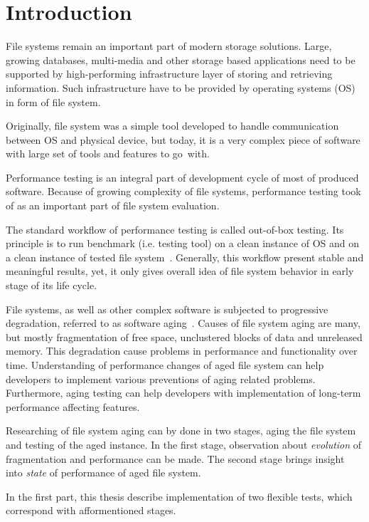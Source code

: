 \documentclass[
  color, %
  table, %
  lof,   %
  lot,   %
]{fithesis3}
\begin{document}
\chapter{Introduction}
File systems remain an important part of modern storage solutions.  Large, growing databases, multi-media and other storage based applications need to be supported by high-performing infrastructure layer of storing and retrieving information. Such infrastructure have to be provided by operating systems (OS) in form of file system.

Originally, file system was a simple tool developed to handle communication between OS and physical device, but today, it is a very complex piece of software with large set of tools and features to go~with.

Performance testing is an integral part of development cycle of most of produced software. Because of growing complexity of file systems, performance testing took of as an important part of file system evaluation.

The standard workflow of performance testing is called out-of-box testing. Its principle is to run benchmark (i.e. testing tool) on a clean instance of OS and on a clean instance of tested file system~\cite{Traeger:2008:NYS:1367829.1367831}. Generally, this workflow present stable and meaningful results, yet, it only gives overall idea of file system behavior in early stage of its life cycle. 

File systems, as well as other complex software is subjected to progressive degradation, referred to as software aging~\cite{Cotroneo:2014:SSA:2543749.2539117}. Causes of file system aging are many, but mostly fragmentation of free space, unclustered blocks of data and unreleased memory. This degradation cause problems in performance and functionality over time. Understanding of performance changes of aged file system can help developers to implement various preventions of aging related problems. Furthermore, aging testing can help developers with implementation of long-term performance affecting features.

Researching of file system aging can by done in two stages, aging the file system and testing of the aged instance. In the first stage, observation about \emph{evolution} of fragmentation and performance can be made. The second stage brings insight into \emph{state} of performance of aged file system.

In the first part, this thesis describe implementation of two flexible tests, which correspond with afformentioned stages.
 
\end{document}
